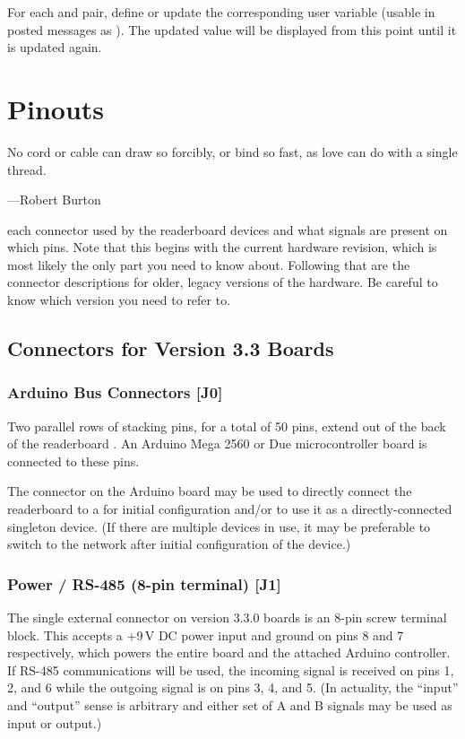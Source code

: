 For each  and  pair, define or update the corresponding
user variable (usable in posted messages as \z{\{\$}\z{\}}). The
updated value will be displayed from this point until it is updated again.

\chapter{Pinouts}
\epigraph{No cord or cable can draw so forcibly, or bind so fast, as love can do with a single thread.}{---Robert Burton}
 each connector used by the readerboard devices and what signals are present
on which pins. Note that this begins with the current hardware revision, which is most likely the only part you need
to know about. Following that are the connector descriptions for older, legacy versions of the hardware. Be careful to
know which version you need to refer to.

\section{Connectors for Version 3.3 Boards}
\subsection{Arduino Bus Connectors [J0]}
Two parallel rows of stacking pins, for a total of 50 pins, extend out of the back of the readerboard .
An Arduino Mega 2560 or Due microcontroller board is connected to these pins.

The  connector on the Arduino board may be used to directly connect the readerboard to a 
for initial configuration and/or to use it as a directly-connected singleton device. (If there are multiple
devices in use, it may be preferable to switch to the  network after initial configuration of the
device.)

\subsection{Power / RS-485 (8-pin terminal) [J1]}
The single external connector on version 3.3.0 boards is an 8-pin screw terminal block. This accepts a +9\,V DC power input
and ground on pins 8 and 7 respectively, which powers the entire board and the attached Arduino controller.  If RS-485
communications will be used, the incoming signal is received on pins 1, 2, and 6 while the outgoing signal is on
pins 3, 4, and 5. (In actuality, the ``input'' and ``output'' sense is arbitrary and either set of A and B signals
may be used as input or output.) 

